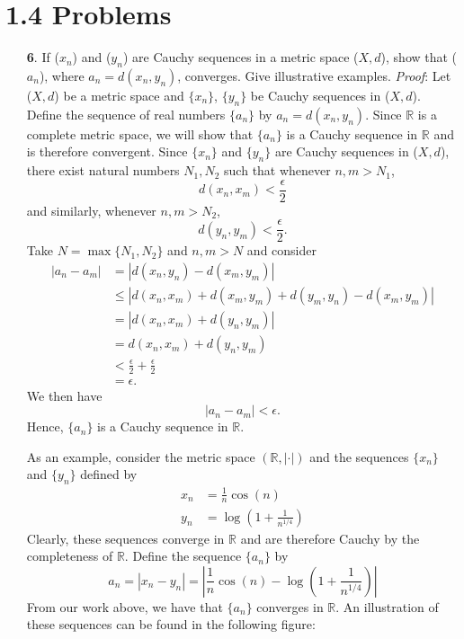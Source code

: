 \documentclass{article}
\begin{document}
\section*{1.4 Problems}
\begin{itemize}
    \item[\textbf{6}.] If ($x_n$) and ($y_n$) are Cauchy sequences in a metric space ($X,d$), show that ($a_n$), where $a_n = d(x_n,y_n)$, converges. Give illustrative examples.
    \newline\newline
    \textit{Proof}: Let ($X,d$) be a metric space and $\{x_n\}$, $\{y_n\}$ be Cauchy sequences in ($X,d$). Define the sequence of real numbers $\{a_n\}$ by $a_n = d(x_n,y_n)$. Since $\mathbb{R}$ is a complete metric space, we will show that $\{a_n\}$ is a Cauchy sequence in $\mathbb{R}$ and is therefore convergent. 
    \newline
    Since $\{x_n\}$ and $\{y_n\}$ are Cauchy sequences in ($X,d$), there exist natural numbers $N_1,N_2$ such that whenever $n,m > N_1$, 
    \[d(x_n,x_m) < \frac{\epsilon}{2}\]
    and similarly, whenever $n,m > N_2$,
    \[d(y_n,y_m) < \frac{\epsilon}{2}.\]
    Take $N = \max\{N_1,N_2\}$ and $n,m > N$ and consider 
    \begin{align*}
        |a_n - a_m| &= |d(x_n,y_n) - d(x_m,y_m)|\\
        &\leq |d(x_n, x_m) + d(x_m, y_m) + d(y_m,y_n) - d(x_m,y_m)|\\
        &= |d(x_n,x_m) + d(y_n,y_m)|\\
        &= d(x_n,x_m) + d(y_n,y_m)\\
        &< \frac{\epsilon}{2} + \frac{\epsilon}{2}\\
        &= \epsilon.
    \end{align*}
    We then  have
    \[|a_n - a_m| < \epsilon.\]
    Hence, $\{a_n\}$ is a Cauchy sequence in $\mathbb{R}$.
    \newline

    As an example, consider the metric space $(\mathbb{R}, |\cdot|)$ and the sequences $\{x_n\}$ and $\{y_n\}$ defined by
    \begin{align*}
        x_n &= \frac{1}{n}\cos(n)\\
        y_n &= \log\left(1 + \frac{1}{n^{1/4}}\right)
    \end{align*}
    Clearly, these sequences converge in $\mathbb{R}$ and are therefore Cauchy by the completeness of $\mathbb{R}$. Define the sequence $\{a_n\}$ by
    \[a_n = |x_n - y_n| = \left|\frac{1}{n}\cos(n) - \log\left(1 + \frac{1}{n^{1/4}}\right)\right|\]
    From our work above, we have that $\{a_n\}$ converges in $\mathbb{R}$. An illustration of these sequences can be found in the following figure:
    

\end{itemize}
\end{document}
